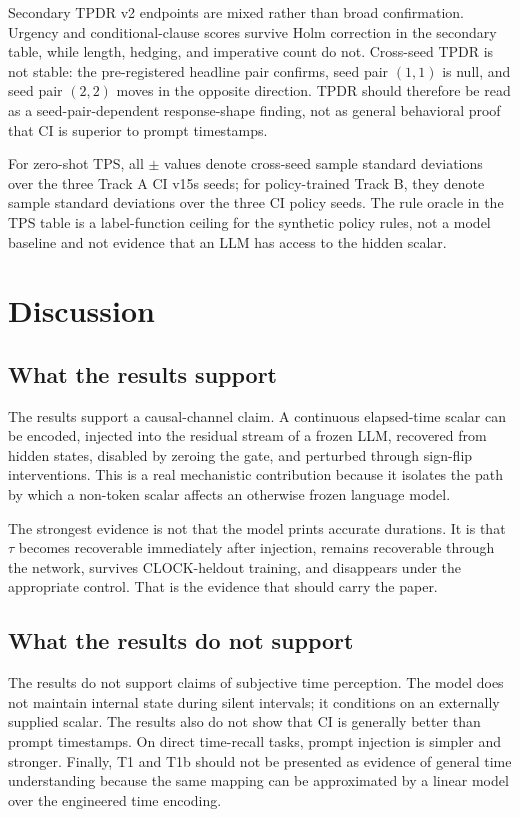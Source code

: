 \documentclass[conference,10pt]{IEEEtran}
\newcommand{\CI}{\textsc{CI}}
\newcommand{\Tau}{\tau}
\begin{document}
Secondary TPDR v2 endpoints are mixed rather than broad confirmation. Urgency and conditional-clause scores survive Holm correction in the secondary table, while length, hedging, and imperative count do not. Cross-seed TPDR is not stable: the pre-registered headline pair confirms, seed pair $(1,1)$ is null, and seed pair $(2,2)$ moves in the opposite direction. TPDR should therefore be read as a seed-pair-dependent response-shape finding, not as general behavioral proof that \CI{} is superior to prompt timestamps.



For zero-shot TPS, all $\pm$ values denote cross-seed sample standard deviations over the three Track A \CI{} v15s seeds; for policy-trained Track B, they denote sample standard deviations over the three \CI{} policy seeds. The rule oracle in the TPS table is a label-function ceiling for the synthetic policy rules, not a model baseline and not evidence that an LLM has access to the hidden scalar.


\section{Discussion}

\subsection{What the results support}

The results support a causal-channel claim. A continuous elapsed-time scalar can be encoded, injected into the residual stream of a frozen LLM, recovered from hidden states, disabled by zeroing the gate, and perturbed through sign-flip interventions. This is a real mechanistic contribution because it isolates the path by which a non-token scalar affects an otherwise frozen language model.

The strongest evidence is not that the model prints accurate durations. It is that $\Tau$ becomes recoverable immediately after injection, remains recoverable through the network, survives CLOCK-heldout training, and disappears under the appropriate control. That is the evidence that should carry the paper.

\subsection{What the results do not support}

The results do not support claims of subjective time perception. The model does not maintain internal state during silent intervals; it conditions on an externally supplied scalar. The results also do not show that \CI{} is generally better than prompt timestamps. On direct time-recall tasks, prompt injection is simpler and stronger. Finally, T1 and T1b should not be presented as evidence of general time understanding because the same mapping can be approximated by a linear model over the engineered time encoding.
\end{document}
